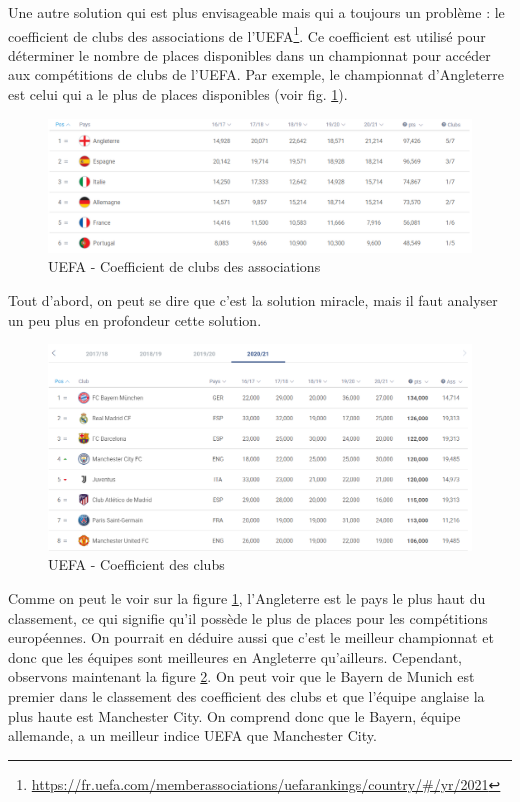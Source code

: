 \documentclass[a4paper,14pt]{extarticle}
\begin{document}
{Une autre solution qui est plus envisageable mais qui a toujours un problème : le coefficient de clubs des associations de l'UEFA\footnote{\url{https://fr.uefa.com/memberassociations/uefarankings/country/\#/yr/2021}}. Ce coefficient est utilisé pour déterminer le nombre de places disponibles dans un championnat pour accéder aux compétitions de clubs de l'UEFA. Par exemple, le championnat d'Angleterre est celui qui a le plus de places disponibles (voir fig. \ref{fig:coeffClubsAssoc}).

\begin{figure}[htp]
    \centering
    \includegraphics[width=16cm]{../img/coeffClubAssoc.png}
    \caption{UEFA - Coefficient de clubs des associations}
    \label{fig:coeffClubsAssoc}
\end{figure}

Tout d'abord, on peut se dire que c'est la solution miracle, mais il faut analyser un peu plus en profondeur cette solution.

\begin{figure}[htp]
    \centering
    \includegraphics[width=16cm]{../img/coeffClubs.png}
    \caption{UEFA - Coefficient des clubs}
    \label{fig:coeffClubs}
\end{figure}

Comme on peut le voir sur la figure \ref{fig:coeffClubsAssoc}, l'Angleterre est le pays le plus haut du classement, ce qui signifie qu'il possède le plus de places pour les compétitions européennes. On pourrait en déduire aussi que c'est le meilleur championnat et donc que les équipes sont meilleures en Angleterre qu'ailleurs. Cependant, observons maintenant la figure \ref{fig:coeffClubs}. On peut voir que le Bayern de Munich est premier dans le classement des coefficient des clubs et que l'équipe anglaise la plus haute est Manchester City. On comprend donc que le Bayern, équipe allemande, a un meilleur indice UEFA que Manchester City.

}
\end{document}
